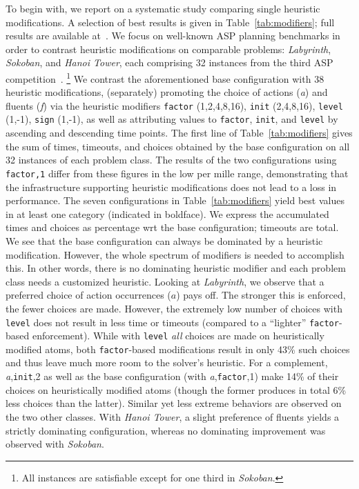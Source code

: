 %
To begin with,
we report on a systematic study comparing single heuristic modifications.
A selection of best results is given in Table~\ref{tab:modifiers};
full results are available at~\cite{hclasp}.
We focus on well-known ASP planning benchmarks in order to contrast heuristic modifications on comparable problems:
\textit{Labyrinth}, \textit{Sokoban}, and \textit{Hanoi Tower}, each comprising 32 instances from the third ASP competition~\cite{contest11a}.%
\footnote{All instances are satisfiable except for one third in \textit{Sokoban}.}
We contrast the aforementioned base configuration with 38 heuristic modifications,
(separately) promoting the choice of actions (\emph{a}) and fluents (\emph{f}) via the heuristic modifiers
\texttt{factor} (1,2,4,8,16),
\texttt{init} (2,4,8,16),
\texttt{level} (1,-1),
\texttt{sign} (1,-1),
as well as attributing values to \texttt{factor}, \texttt{init}, and \texttt{level} by ascending and descending time points.
%
The first line of Table~\ref{tab:modifiers} gives the sum of times, timeouts, and choices obtained by the base configuration on all 32 instances of each problem class.
The results of the two configurations using \texttt{factor,1} differ from these figures in the low per mille range, demonstrating that the infrastructure supporting heuristic
modifications does not lead to a loss in performance.
The seven configurations in Table~\ref{tab:modifiers} yield best values in at least one category (indicated in boldface).
We express the accumulated times and choices as percentage wrt the base configuration; timeouts are total.
We see that the base configuration can always be dominated by a heuristic modification.
However, the whole spectrum of modifiers is needed to accomplish this.
In other words, there is no dominating heuristic modifier and each problem class needs a customized heuristic.
Looking at \textit{Labyrinth}, we observe that a preferred choice of action occurrences ($a$) pays off.
The stronger this is enforced, the fewer choices are made.
However, the extremely low number of choices with \texttt{level} does not result in less time or timeouts
(compared to a ``lighter'' \texttt{factor}-based enforcement).
While with \texttt{level} \emph{all} choices are made on heuristically modified atoms,
both \texttt{factor}-based modifications result in only 43\% such choices and thus leave much more room to the solver's heuristic.
For a complement, \textit{a},\texttt{init},2 as well as the base configuration (with \textit{a},\texttt{factor},1) 
make 14\% of their choices on heuristically modified atoms
(though the former produces in total 6\% less choices than the latter).
Similar yet less extreme behaviors are observed on the two other classes.
With \textit{Hanoi Tower}, a slight preference of fluents yields a strictly dominating configuration,
whereas no dominating improvement was observed with \textit{Sokoban}.

